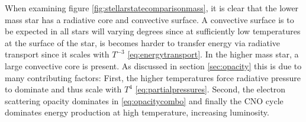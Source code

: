 \documentclass[11pt]{article}
\begin{document}
    When examining figure \ref{fig:stellarstatecomparisonmass}, it is clear that the lower mass star has a radiative core and convective surface. A convective surface is to be expected in all stars will varying degrees since at sufficiently low temperatures at the surface of the star, is becomes harder to transfer energy via radiative transport since it scales with $T^{-3}$ \eqref{eq:energytransport}. In the higher mass star, a large convective core is present. As discussed in section \ref{sec:opacity} this is due to many contributing factors: First, the higher temperatures force radiative pressure to dominate and thus scale with $T^4$ \eqref{eq:partialpressures}. Second, the electron scattering opacity dominates in \eqref{eq:opacitycombo} and finally the CNO cycle dominates energy production at high temperature, increasing luminosity. \\
\end{document}
